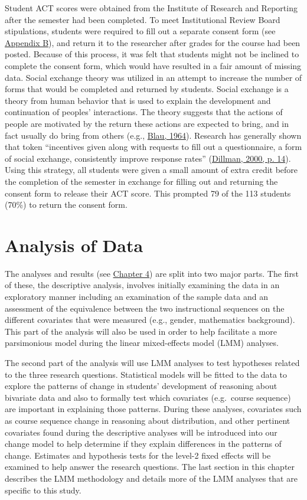 \documentclass[11pt]{umnthesis}
\begin{document}
Student ACT scores were obtained from the Institute of Research and Reporting after the semester had been completed. To meet Institutional Review Board stipulations, students were required to fill out a separate consent form (see \protect\hyperlink{appendix-b}{Appendix B}), and return it to the researcher after grades for the course had been posted. Because of this process, it was felt that students might not be inclined to complete the consent form, which would have resulted in a fair amount of missing data. Social exchange theory was utilized in an attempt to increase the number of forms that would be completed and returned by students. Social exchange is a theory from human behavior that is used to explain the development and continuation of peoples' interactions. The theory suggests that the actions of people are motivated by the return these actions are expected to bring, and in fact usually do bring from others (e.g., \protect\hyperlink{ref-blau:1964}{Blau, 1964}). Research has generally shown that token ``incentives given along with requests to fill out a questionnaire, a form of social exchange, consistently improve response rates'' (\protect\hyperlink{ref-dillman:2000}{Dillman, 2000, p. 14}). Using this strategy, all students were given a small amount of extra credit before the completion of the semester in exchange for filling out and returning the consent form to release their ACT score. This prompted 79 of the 113 students (70\%) to return the consent form.

\hypertarget{analysis-of-data}{%
\section{Analysis of Data}\label{analysis-of-data}}

The analyses and results (see \protect\hyperlink{results}{Chapter 4}) are split into two major parts. The first of these, the descriptive analysis, involves initially examining the data in an exploratory manner including an examination of the sample data and an assessment of the equivalence between the two instructional sequences on the different covariates that were measured (e.g., gender, mathematics background). This part of the analysis will also be used in order to help facilitate a more parsimonious model during the linear mixed-effects model (LMM) analyses.

The second part of the analysis will use LMM analyses to test hypotheses related to the three research questions. Statistical models will be fitted to the data to explore the patterns of change in students' development of reasoning about bivariate data and also to formally test which covariates (e.g.~course sequence) are important in explaining those patterns. During these analyses, covariates such as course sequence change in reasoning about distribution, and other pertinent covariates found during the descriptive analyses will be introduced into our change model to help determine if they explain differences in the patterns of change. Estimates and hypothesis tests for the level-2 fixed effects will be examined to help answer the research questions. The last section in this chapter describes the LMM methodology and details more of the LMM analyses that are specific to this study.
\end{document}
